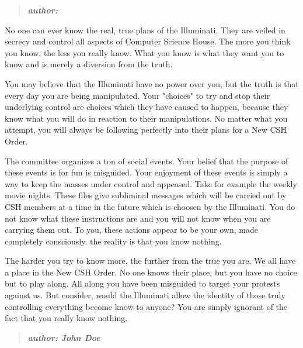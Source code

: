 \documentclass[9pt]{extarticle}
\begin{document}
%
%
\begin{minipage}[t]{.61\linewidth} %
\vspace{-0.4cm}
\hypertarget{firstnews}{}
\begin{quote}
\centering
\textbf{\textit{author: }}
\end{quote}

No one can ever know the real, true plans of the Illuminati. They are veiled 
in secrecy and control all aspects of Computer Science House. The more you 
think you know, the less you really know. What you know is what they want 
you to know and is merely a diversion from the truth. 

You may believe that the Illuminati have no power over you, but the truth is 
that every day you are being manipulated. Your "choices" to try and stop 
their underlying control are choices which they have caused to happen, because
they know what you will do in reaction to their manipulations. No matter what
you attempt, you will always be following perfectly into their plans for a 
New CSH Order. 

The committee organizes a ton of social events. Your belief that the purpose of
these events is for fun is misguided. Your enjoyment of these events is simply
a way to keep the masses under control and appeased. Take for example the weekly
movie nights. These files give subliminal messages which will be carried out by
CSH members at a time in the future which is choosen by the Illuminati. You
do not know what these instructions are and you will not know when you are
carrying them out. To you, these actions appear to be your own, made completely
consciously. the reality is that you know nothing. 

The harder you try to know more, the further from the true you are. We all have a 
place in the New CSH Order. No one knows their place, but you have no choice 
but to play along. All along you have been misguided to target your protests 
against us. But consider, would the Illuminati allow the identity of those 
truly controlling everything become know to anyone? You are simply ignorant of
the fact that you really know nothing.


\hypertarget{secondnews}{} 
\begin{quote}
\centering
\textbf{\textit{author: John Doe }}
\end{quote}


\end{minipage} %
\end{document}
